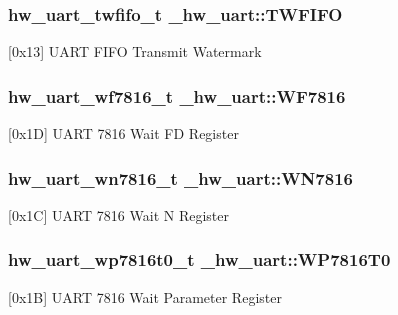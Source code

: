 \subsubsection[{\texorpdfstring{T\+W\+F\+I\+FO}{TWFIFO}}]{ {\bf hw\+\_\+uart\+\_\+twfifo\+\_\+t} \+\_\+hw\+\_\+uart\+::\+T\+W\+F\+I\+FO}\hypertarget{struct__hw__uart_aed094bea35e9d91e55fe46abfa197c3e}{}\label{struct__hw__uart_aed094bea35e9d91e55fe46abfa197c3e}
\mbox{[}0x13\mbox{]} U\+A\+RT F\+I\+FO Transmit Watermark 
\subsubsection[{\texorpdfstring{W\+F7816}{WF7816}}]{ {\bf hw\+\_\+uart\+\_\+wf7816\+\_\+t} \+\_\+hw\+\_\+uart\+::\+W\+F7816}\hypertarget{struct__hw__uart_a4b0dfffdac899dbe64ccf04a1716e080}{}\label{struct__hw__uart_a4b0dfffdac899dbe64ccf04a1716e080}
\mbox{[}0x1D\mbox{]} U\+A\+RT 7816 Wait FD Register 
\subsubsection[{\texorpdfstring{W\+N7816}{WN7816}}]{ {\bf hw\+\_\+uart\+\_\+wn7816\+\_\+t} \+\_\+hw\+\_\+uart\+::\+W\+N7816}\hypertarget{struct__hw__uart_a18492a6807b7e4c19220dd0f30573a81}{}\label{struct__hw__uart_a18492a6807b7e4c19220dd0f30573a81}
\mbox{[}0x1C\mbox{]} U\+A\+RT 7816 Wait N Register 
\subsubsection[{\texorpdfstring{W\+P7816\+T0}{WP7816T0}}]{ {\bf hw\+\_\+uart\+\_\+wp7816t0\+\_\+t} \+\_\+hw\+\_\+uart\+::\+W\+P7816\+T0}\hypertarget{struct__hw__uart_a88b8473e6ec93eb85dbf4db772600270}{}\label{struct__hw__uart_a88b8473e6ec93eb85dbf4db772600270}
\mbox{[}0x1B\mbox{]} U\+A\+RT 7816 Wait Parameter Register 
